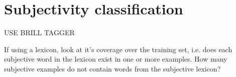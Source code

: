 \chapter{Subjectivity classification}
\label{subjectivity}

USE BRILL TAGGER

If using a lexicon, look at it's coverage over the training set, i.e. does each subjective word in the lexicon exist in one or more examples. How many subjective examples do not contain words from the subjective lexicon?